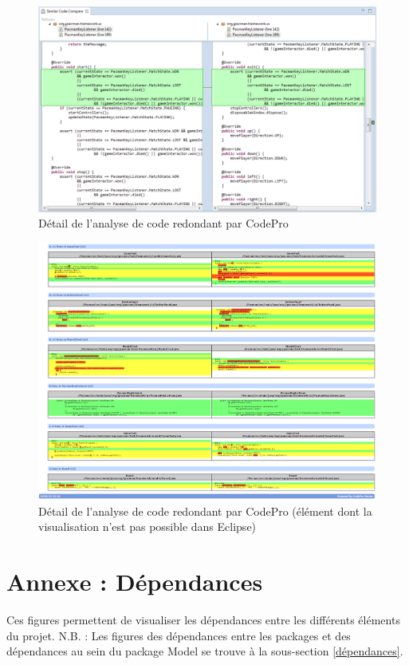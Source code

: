 \documentclass[12pt,a4paper,final]{article}
\begin{document}
\begin{figure}[ht]
	\centering
	\includegraphics[width=\textwidth]{images/SimilarCode_4.png}
	\caption{\label{SimilarCode4}Détail de l'analyse de code redondant par CodePro}
\end{figure}

\begin{figure}[ht]
	\centering
	\includegraphics[width=\textwidth]{images/SimilarCode_5.png}
	\caption{\label{SimilarCode5}Détail de l'analyse de code redondant par CodePro (élément dont la visualisation n'est pas possible dans Eclipse)}
\end{figure}

\clearpage
\newpage
\section{Annexe : Dépendances}\label{Dependencies}
Ces figures permettent de visualiser les dépendances entre les différents éléments du projet.
N.B. : Les figures des dépendances entre les packages et des dépendances au sein du package Model se trouve  à la sous-section \ref{dépendances}.
\end{document}
